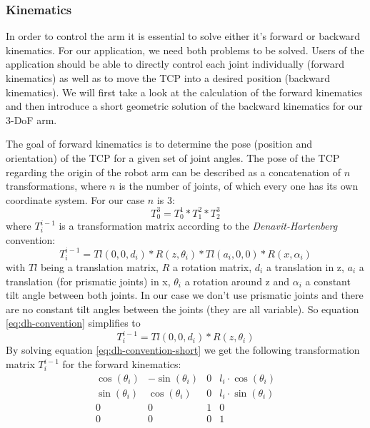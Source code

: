 \documentclass[conference]{IEEEtran}
\begin{document}
\subsubsection{Kinematics}\label{sec:kinematics}
In order to control the arm it is essential to solve either it's forward or backward kinematics. For our application, we need both problems to be solved. Users of the application should be able to directly control each joint individually (forward kinematics) as well as to move the TCP into a desired position (backward kinematics). We will first take a look at the calculation of the forward kinematics and then introduce a short geometric solution of the backward kinematics for our 3-DoF arm.
\par
The goal of forward kinematics is to determine the pose (position and orientation) of the TCP for a given set of joint angles. The pose of the TCP regarding the origin of the robot arm can be described as a concatenation of $n$ transformations, where $n$ is the number of joints, of which every one has its own coordinate system. For our case $n$ is 3:
\begin{equation}\label{eq:trans_matrix}
T_0^3 = T_0^1 * T_1^2 * T_2^3
\end{equation}
where $T_i^{i-1}$ is a transformation matrix according to the \textit{Denavit-Hartenberg} convention:
\begin{equation}\label{eq:dh-convention}
T_i^{i-1} = Tl(0,0,d_i) * R(z, \theta_i) * Tl(a_i,0,0) * R(x, \alpha_i)
\end{equation}
with $Tl$ being a translation matrix, $R$ a rotation matrix, $d_i$ a translation in z, $a_i$ a translation (for prismatic joints) in x, $\theta_i$ a rotation around z and $\alpha_i$ a constant tilt angle between both joints. In our case we don't use prismatic joints and there are no constant tilt angles between the joints (they are all variable). So equation \ref{eq:dh-convention} simplifies to 
\begin{equation}\label{eq:dh-convention-short}
T_i^{i-1} = Tl(0,0,d_i) * R(z, \theta_i)
\end{equation}
By solving equation \ref{eq:dh-convention-short} we get the following transformation matrix $T_i^{i-1}$ for the forward kinematics:
\[
\begin{matrix}
\cos(\theta_i) & -\sin(\theta_i) & 0 & l_i \cdot \cos(\theta_i)  \\
\sin(\theta_i) & \cos(\theta_i) & 0 & l_i \cdot \sin(\theta_i) \\
0 & 0 & 1 & 0 \\
0 & 0 & 0 & 1
\end{matrix}
\]
\end{document}
